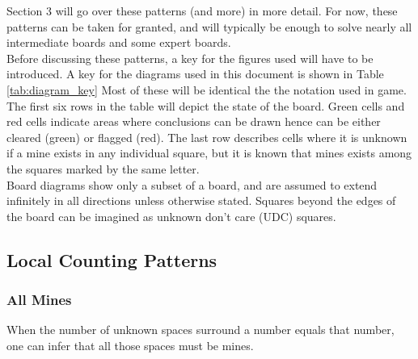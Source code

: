 Section 3 will go over these patterns (and more) in more detail. For now, these patterns can be taken for granted, and will typically be enough to solve nearly all intermediate boards and some expert boards.\\

Before discussing these patterns, a key for the figures used will have to be introduced. A key for the diagrams used in this document is shown in Table \ref{tab:diagram_key} Most of these will be identical the the notation used in game. The first six rows in the table will depict the state of the board. Green cells and red cells indicate areas where conclusions can be drawn hence can be either cleared (green) or flagged (red). The last row describes cells where it is unknown if a mine exists in any individual square, but it is known that mines exists among the squares marked by the same letter.\\

Board diagrams show only a subset of a board, and are assumed to extend infinitely in all directions unless otherwise stated. Squares beyond the edges of the board can be imagined as unknown don't care (UDC) squares.\\


\subsection{Local Counting Patterns}
\subsubsection*{All Mines}
When the number of unknown spaces surround a number equals that number, one can infer that all those spaces must be mines.

